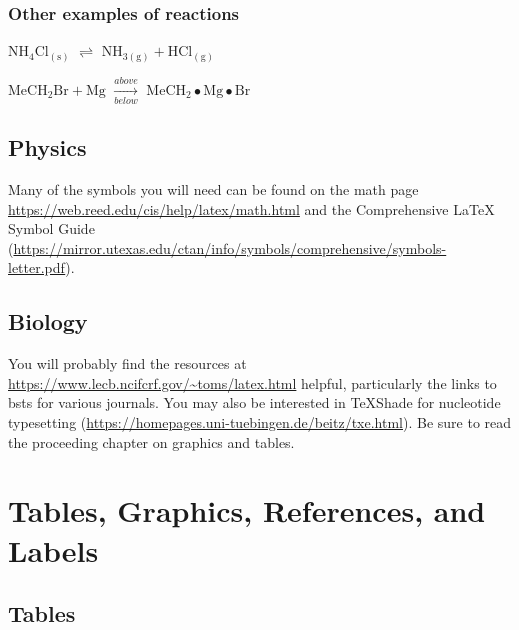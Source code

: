 \documentclass[12pt,twoside]{reedthesis}
\begin{document}
\hypertarget{other-examples-of-reactions}{%
\subsection{Other examples of reactions}\label{other-examples-of-reactions}}

\(\mathrm{NH_4Cl_{(s)}}\) \(\rightleftharpoons\) \(\mathrm{NH_{3(g)}+HCl_{(g)}}\)

\noindent \(\mathrm{MeCH_2Br + Mg}\) \(\xrightarrow[below]{above}\) \(\mathrm{MeCH_2\bullet Mg \bullet Br}\)

\hypertarget{physics}{%
\section{Physics}\label{physics}}

Many of the symbols you will need can be found on the math page \url{https://web.reed.edu/cis/help/latex/math.html} and the Comprehensive LaTeX Symbol Guide (\url{https://mirror.utexas.edu/ctan/info/symbols/comprehensive/symbols-letter.pdf}).

\hypertarget{biology}{%
\section{Biology}\label{biology}}

You will probably find the resources at \url{https://www.lecb.ncifcrf.gov/~toms/latex.html} helpful, particularly the links to bsts for various journals. You may also be interested in TeXShade for nucleotide typesetting (\url{https://homepages.uni-tuebingen.de/beitz/txe.html}). Be sure to read the proceeding chapter on graphics and tables.

\hypertarget{ref-labels}{%
\chapter{Tables, Graphics, References, and Labels}\label{ref-labels}}

\hypertarget{tables}{%
\section{Tables}\label{tables}}
\end{document}
